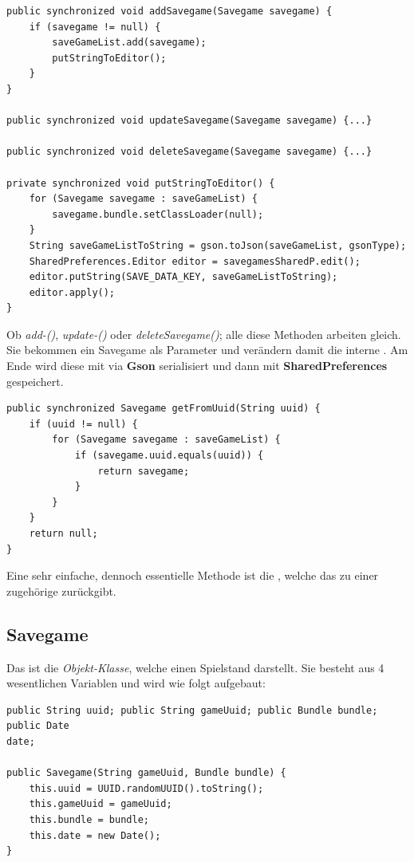 \begin{lstlisting}[caption={SavegameStorage Speicherfunktionen},captionpos=b]
public synchronized void addSavegame(Savegame savegame) {
	if (savegame != null) {
		saveGameList.add(savegame);
		putStringToEditor();
	}
}

public synchronized void updateSavegame(Savegame savegame) {...}

public synchronized void deleteSavegame(Savegame savegame) {...}

private synchronized void putStringToEditor() {
	for (Savegame savegame : saveGameList) {
		savegame.bundle.setClassLoader(null);
	}
	String saveGameListToString = gson.toJson(saveGameList, gsonType);
	SharedPreferences.Editor editor = savegamesSharedP.edit();
	editor.putString(SAVE_DATA_KEY, saveGameListToString);
	editor.apply();
}
\end{lstlisting}
 
Ob \emph{add-()}, \emph{update-()} oder \emph{deleteSavegame()}; alle diese
Methoden arbeiten gleich. Sie bekommen ein Savegame als Parameter und verändern
damit die interne . Am Ende wird diese mit
 via \textbf{Gson} serialisiert und dann mit
\textbf{SharedPreferences} gespeichert.

\begin{lstlisting}[caption={SavegameStorage Suche der Spielstände},captionpos=b]
public synchronized Savegame getFromUuid(String uuid) {
	if (uuid != null) {
		for (Savegame savegame : saveGameList) {
			if (savegame.uuid.equals(uuid)) {
				return savegame;
			}
		}
	}
	return null;
}
\end{lstlisting}

Eine sehr einfache, dennoch essentielle Methode ist die ,
welche das zu einer  zugehörige  zurückgibt.

\subsection{Savegame}

Das ist die \emph{Objekt-Klasse}, welche einen Spielstand darstellt. Sie besteht
aus 4 wesentlichen Variablen und wird wie folgt aufgebaut:

\begin{lstlisting}[caption={Savegame Variablen \& Konstruktor},captionpos=b]
public String uuid; public String gameUuid; public Bundle bundle; public Date
date;

public Savegame(String gameUuid, Bundle bundle) {
	this.uuid = UUID.randomUUID().toString();
	this.gameUuid = gameUuid;
	this.bundle = bundle;
	this.date = new Date();
}
\end{lstlisting}

